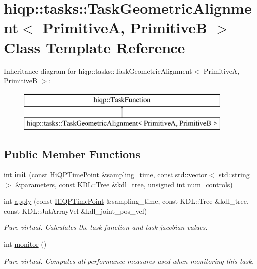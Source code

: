 \hypertarget{classhiqp_1_1tasks_1_1TaskGeometricAlignment}{\section{hiqp\-:\-:tasks\-:\-:Task\-Geometric\-Alignment$<$ Primitive\-A, Primitive\-B $>$ Class Template Reference}
\label{classhiqp_1_1tasks_1_1TaskGeometricAlignment}
}
Inheritance diagram for hiqp\-:\-:tasks\-:\-:Task\-Geometric\-Alignment$<$ Primitive\-A, Primitive\-B $>$\-:\begin{figure}[H]
\begin{center}
\leavevmode
\includegraphics[height=2.000000cm]{classhiqp_1_1tasks_1_1TaskGeometricAlignment}
\end{center}
\end{figure}
\subsection*{Public Member Functions}
\begin{DoxyCompactItemize}
\item 
\hypertarget{classhiqp_1_1tasks_1_1TaskGeometricAlignment_a41d4695cd89c56d5f74b74f8ab0a222c}{int {\bfseries init} (const \hyperlink{classhiqp_1_1HiQPTimePoint}{Hi\-Q\-P\-Time\-Point} \&sampling\-\_\-time, const std\-::vector$<$ std\-::string $>$ \&parameters, const K\-D\-L\-::\-Tree \&kdl\-\_\-tree, unsigned int num\-\_\-controls)}\label{classhiqp_1_1tasks_1_1TaskGeometricAlignment_a41d4695cd89c56d5f74b74f8ab0a222c}

\item 
int \hyperlink{classhiqp_1_1tasks_1_1TaskGeometricAlignment_aa46e561c924dd0a65f463a715ed387a3}{apply} (const \hyperlink{classhiqp_1_1HiQPTimePoint}{Hi\-Q\-P\-Time\-Point} \&sampling\-\_\-time, const K\-D\-L\-::\-Tree \&kdl\-\_\-tree, const K\-D\-L\-::\-Jnt\-Array\-Vel \&kdl\-\_\-joint\-\_\-pos\-\_\-vel)
\begin{DoxyCompactList}\small\item\em {\itshape Pure virtual}. Calculates the task function and task jacobian values. \end{DoxyCompactList}\item 
int \hyperlink{classhiqp_1_1tasks_1_1TaskGeometricAlignment_a1c01a7489e846175992a44a62a8a7436}{monitor} ()
\begin{DoxyCompactList}\small\item\em {\itshape Pure virtual}. Computes all performance measures used when monitoring this task. \end{DoxyCompactList}\end{DoxyCompactItemize}
